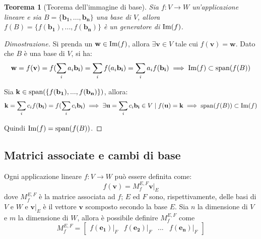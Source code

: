 \documentclass{article}
\newtheorem{theorem}{Teorema}
\begin{document}
    \vspace{10pt}
    \begin{theorem}[Teorema dell'immagine di base]
        Sia $f : V \rightarrow W$ un'applicazione lineare e sia $B = \{\mathbf{b_1}, ..., \mathbf{b_n}\}$ una base di $V$, allora $f(B) = \{f(\mathbf{b_1}), ..., f(\mathbf{b_n})\}$ è un generatore di $\textnormal{Im}(f)$.
    \end{theorem}

    \begin{proof}[Dimostrazione]
        Si prenda un $\mathbf{w} \in \textnormal{Im}(f)$, allora $\exists \mathbf{v} \in V$ tale cui $f(\mathbf{v}) = \mathbf{w}$. Dato che $B$ è una base di $V$, si ha:
        \[
            \mathbf{w} = f(\mathbf{v}) = f(\sum_{i} a_i \mathbf{b_i}) = \sum_{i} f(a_i \mathbf{b_i}) = \sum_{i} a_i f(\mathbf{b_i}) \implies \textnormal{Im}(f) \subset \textnormal{span}(f(B))
        \]

        Sia $\mathbf{k} \in \textnormal{span}(\{f(\mathbf{b_1}), ..., f(\mathbf{b_n})\})$, allora:
        \[
            \mathbf{k} = \sum_{i} c_i f(\mathbf{b_i}) = f(\sum_{i} c_i \mathbf{b_i}) \implies \exists \mathbf{u} = \sum_{i} c_i \mathbf{b_i} \in V \; | \; f(\mathbf{u}) = \mathbf{k} \implies \textnormal{span}(f(B)) \subset \textnormal{Im}(f)
        \]

        Quindi $\textnormal{Im}(f) = \textnormal{span}(f(B))$. 
    \end{proof}



\vspace{10pt}
\subsection{Matrici associate e cambi di base}
    Ogni applicazione lineare $f: V \rightarrow W$ può essere definita come:
    \[
        f(\mathbf{v}) = M_{f}^{E, F}\mathbf{v}\rvert_{E}
    \]
    dove $M_{f}^{E, F}$ è la matrice associata ad $f$; $E$ ed $F$ sono, rispettivamente, delle basi di $V$ e $W$ e $\mathbf{v}\rvert_{E}$ è il vettore $\mathbf{v}$ scomposto secondo la base $E$.
    Sia $n$ la dimensione di $V$ e $m$ la dimensione di $W$, allora è possibile definire $M_{f}^{E, F}$ come
    \[
        M_{f}^{E, F} = \begin{bmatrix} f(\mathbf{e_1})\rvert_{F} & f(\mathbf{e_2})\rvert_{F} & ... & f(\mathbf{e_n})\rvert_{F} \end{bmatrix}
    \]
\end{document}
